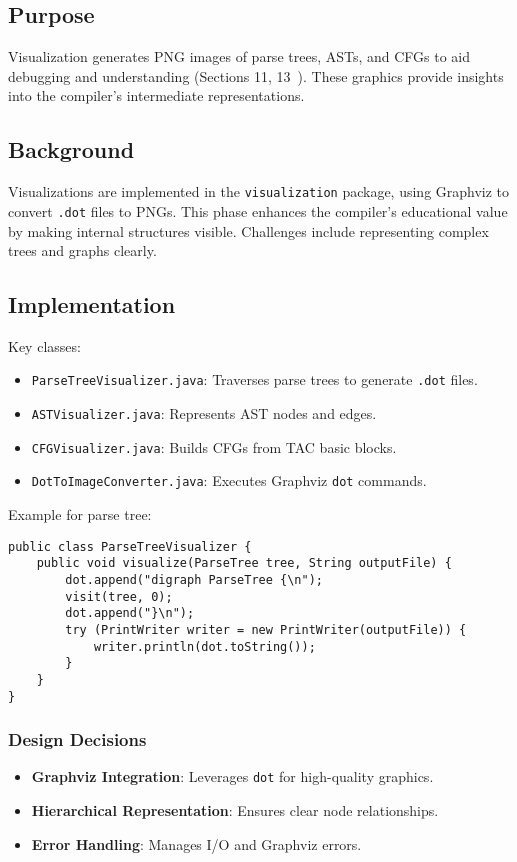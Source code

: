 \documentclass[11pt, titlepage]{article}
\begin{document}
\subsection{Purpose}
Visualization generates PNG images of parse trees, ASTs, and CFGs to aid debugging and understanding (Sections 11, 13~\cite{cool_manual}). These graphics provide insights into the compiler's intermediate representations.

\subsection{Background}
Visualizations are implemented in the \texttt{visualization} package, using Graphviz to convert \texttt{.dot} files to PNGs. This phase enhances the compiler's educational value by making internal structures visible. Challenges include representing complex trees and graphs clearly.

\subsection{Implementation}
Key classes:
\begin{itemize}[leftmargin=*]
    \item \texttt{ParseTreeVisualizer.java}: Traverses parse trees to generate \texttt{.dot} files.
    \item \texttt{ASTVisualizer.java}: Represents AST nodes and edges.
    \item \texttt{CFGVisualizer.java}: Builds CFGs from TAC basic blocks.
    \item \texttt{DotToImageConverter.java}: Executes Graphviz \texttt{dot} commands.
\end{itemize}

Example for parse tree:

\begin{lstlisting}
public class ParseTreeVisualizer {
    public void visualize(ParseTree tree, String outputFile) {
        dot.append("digraph ParseTree {\n");
        visit(tree, 0);
        dot.append("}\n");
        try (PrintWriter writer = new PrintWriter(outputFile)) {
            writer.println(dot.toString());
        }
    }
}
\end{lstlisting}

\subsubsection{Design Decisions}
\begin{itemize}[leftmargin=*]
    \item \textbf{Graphviz Integration}: Leverages \texttt{dot} for high-quality graphics.
    \item \textbf{Hierarchical Representation}: Ensures clear node relationships.
    \item \textbf{Error Handling}: Manages I/O and Graphviz errors.
\end{itemize}
\end{document}
